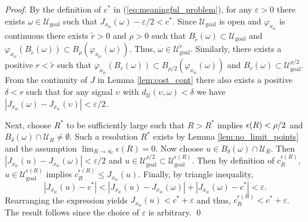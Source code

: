 \documentclass{llncs}
\begin{document}
\begin{proof}
By the definition of $c^{*}$ in (\ref{eq:meaningful_problem}), for any
$\varepsilon>0$ there exists $\omega\in\mathcal{U}_\mathrm{goal}$ such
that $J_{x_\mathrm{ic}}(\omega)-\varepsilon/2<c^{*}$. Since
$\mathcal{U}_\mathrm{goal}$ is open and $\varphi_{x_\mathrm{ic}}$ is continuous there exists $\tilde{r}>0$ and $\rho>0$
such that $B_{\tilde{r}}(\omega)\subset\mathcal{U}_\mathrm{goal}$ and $\varphi_{x_\mathrm{ic}}(B_{\tilde{r}}(\omega))\subset B_{\rho}(\varphi_{x_\mathrm{ic}}(\omega))$.
Thus, $\omega\in\mathcal{U}_\mathrm{goal}^{\tilde{r}}$. Similarly, there exists a positive $r<\tilde{r}$ such that $\varphi_{x_\mathrm{ic}}(B_{r}(\omega))\subset B_{\rho/2}(\varphi_{x_\mathrm{ic}}(\omega))$
and $B_{r}(\omega)\subset\mathcal{U}_\mathrm{goal}^{\rho/2}$. From the continuity
of $J$ in Lemma \ref{lem:cost_cont} there also exists a positive
$\delta<r$ such that for any signal $\upsilon$ with $d_{\mathcal{U}}(\upsilon,\omega)<\delta$
we have $|J_{x_\mathrm{ic}}(\omega)-J_{x_\mathrm{ic}}(\upsilon)|<\varepsilon/2$.

Next, choose $R^{*}$ to be sufficiently large such that $R>R^*$ implies $\mbox{\ensuremath{\epsilon}}(R)<\rho/2$
and $B_{\delta}(\omega)\cap\mathcal{U}_{R}\neq\emptyset$. Such a resolution $R^{*}$ exists by
Lemma \ref{lem:no_limit_points} and the assumption $\lim_{R\rightarrow\infty}\epsilon(R)=0$.
Now choose $u\in B_{\delta}(\omega)\cap\mathcal{U}_{R}$.
Then $|J_{x_\mathrm{ic}}(u)-J_{x_\mathrm{ic}}(\omega)|<\varepsilon/2$ and $u\in\mathcal{U}_\mathrm{goal}^{\rho/2}\subset\mathcal{U}_\mathrm{goal}^{\epsilon(R)}$.
Then by definition of $c_{R}^{\epsilon(R)}$, $u\in\mathcal{U}_\mathrm{goal}^{\epsilon(R)}$
implies $c_{R}^{\epsilon(R)}\leq J_{x_\mathrm{ic}}(u)$. Finally, by triangle
inequality, 
\begin{equation}
|J_{x_\mathrm{ic}}(u)-c^{*}|<|J_{x_\mathrm{ic}}(u)-J_{x_\mathrm{ic}}(\omega)|+|J_{x_\mathrm{ic}}(\omega)-c^{*}|<\varepsilon.
\end{equation}
Rearranging the expression yields $J_{x_\mathrm{ic}}(u)<c^{*}+\varepsilon$
and thus, $c_{R}^{\epsilon(R)}<c^{*}+\varepsilon$. The result follows
since the choice of $\varepsilon$ is arbitrary.
\qed
\end{proof}
\end{document}

